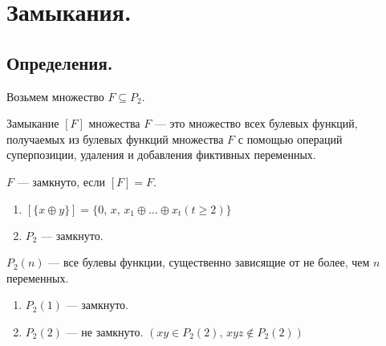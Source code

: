 \section{Замыкания.}

\subsection{Определения.}

Возьмем множество $F \subseteq P_2$.

\begin{definition}
	Замыкание $[F]$ множества $F$ --- это множество всех булевых функций, получаемых из булевых функций множества $F$ с помощью операций суперпозиции, удаления и добавления фиктивных переменных.
\end{definition}

\begin{definition}
	$F$ --- замкнуто, если $[F] = F$.
\end{definition}

\begin{enumerate}
	\item
	$[\{x \oplus y\}] = \{0,\, x,\, x_1 \oplus \ldots \oplus x_t (t \ge 2)\}$
	\item
	$P_2$ --- замкнуто.	
\end{enumerate}

\begin{definition}
	$P_2(n)$ --- все булевы функции, существенно зависящие от не более, чем $n$ переменных.
\end{definition}

\begin{enumerate}
	\item
	$P_2(1)$ --- замкнуто.
	\item
	$P_2(2)$ --- не замкнуто. $\left( xy \in P_2(2),\, xyz \not\in P_2(2) \right)$
\end{enumerate}
